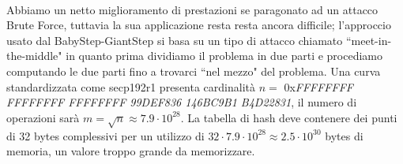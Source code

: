 \documentclass[a4paper,12pt]{tesiinfo}
\begin{document}
\\
Abbiamo un netto miglioramento di prestazioni se paragonato ad un attacco Brute Force, tuttavia la sua applicazione resta resta ancora difficile; l'approccio usato dal BabyStep-GiantStep si basa su un tipo di attacco chiamato ``meet-in-the-middle" in quanto prima dividiamo il problema in due parti e procediamo computando le due parti fino a trovarci ``nel mezzo" del problema. Una curva standardizzata come secp192r1 presenta cardinalit\`a $n = $ 0x\textit{FFFFFFFF FFFFFFFF FFFFFFFF 99DEF836 146BC9B1 B4D22831}, il numero di operazioni sar\`a $m = \sqrt{n} \approx 7.9 \cdot 10^{28}$. La tabella di hash deve contenere dei punti di 32 bytes complessivi per un utilizzo di $32 \cdot 7.9\cdot 10^{28} \approx 2.5 \cdot 10^{30}$ bytes di memoria, un valore troppo grande da memorizzare.
\end{document}
